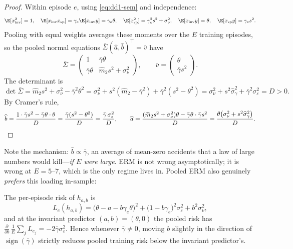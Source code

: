 \begin{proof}
Within episode $e$, using \eqref{eq:dd1-sem} and independence:
\[
\E[x_{\mathrm{inv}}^2] = 1, \quad
\E[x_{\mathrm{inv}} x_{\mathrm{sp}}] = \gamma_e \E[x_{\mathrm{inv}} y]
= \gamma_e \theta, \quad
\E[x_{\mathrm{sp}}^2] = \gamma_e^2 s^2 + \sigma_\nu^2, \quad
\E[x_{\mathrm{inv}} y] = \theta, \quad
\E[x_{\mathrm{sp}} y] = \gamma_e s^2 .
\]
Pooling with equal weights averages these moments over the $E$ training
episodes, so the pooled normal equations
$\bar{\Sigma} (\widehat a, \widehat b)^\top = \bar v$ have
\[
\bar{\Sigma} = \begin{pmatrix} 1 & \bar{\gamma}\theta \\
\bar{\gamma}\theta & \widehat{m}_2 s^2 + \sigma_\nu^2 \end{pmatrix},
\qquad
\bar v = \begin{pmatrix} \theta \\ \bar{\gamma} s^2 \end{pmatrix}.
\]
The determinant is
\[
\det \bar{\Sigma}
= \widehat{m}_2 s^2 + \sigma_\nu^2 - \bar{\gamma}^2 \theta^2
= \sigma_\nu^2 + s^2(\widehat{m}_2 - \bar{\gamma}^2)
+ \bar{\gamma}^2 (s^2 - \theta^2)
= \sigma_\nu^2 + s^2 \widehat{\sigma}_\gamma^2
+ \bar{\gamma}^2 \sigma_\varepsilon^2 = D > 0 .
\]
By Cramer's rule,
\[
\widehat{b} = \frac{1 \cdot \bar{\gamma} s^2 - \bar{\gamma}\theta \cdot
\theta}{D} = \frac{\bar{\gamma}(s^2 - \theta^2)}{D}
= \frac{\bar{\gamma}\, \sigma_\varepsilon^2}{D},
\qquad
\widehat{a} = \frac{(\widehat{m}_2 s^2 + \sigma_\nu^2)\theta -
\bar{\gamma}\theta \cdot \bar{\gamma} s^2}{D}
= \frac{\theta\bigl( \sigma_\nu^2 + s^2 \widehat{\sigma}_\gamma^2
\bigr)}{D}. \qedhere
\]
\end{proof}

Note the mechanism: $\widehat{b} \propto \bar{\gamma}$, an average of
mean-zero accidents that a law of large numbers would kill---\emph{if $E$
were large}. ERM is not wrong asymptotically; it is wrong at $E = 5$--$7$,
which is the only regime \nm{} lives in. Pooled ERM also genuinely
\emph{prefers} this loading in-sample:

\begin{lemma}
\label{lem:dd1-erm-descends}
The per-episode risk of $h_{a,b}$ is
\begin{equation}
\label{eq:dd1-Le}
L_e(h_{a,b})
= \bigl( \theta - a - b\gamma_e\theta \bigr)^2
+ \bigl( 1 - b\gamma_e \bigr)^2 \sigma_\varepsilon^2
+ b^2 \sigma_\nu^2,
\end{equation}
and at the invariant predictor $(a, b) = (\theta, 0)$ the pooled risk has
$\frac{\partial}{\partial b}\, \frac{1}{E}\sum_j L_{e_j} =
-2\bar{\gamma}\sigma_\varepsilon^2$. Hence whenever $\bar{\gamma} \neq 0$,
moving $b$ slightly in the direction of $\operatorname{sign}(\bar\gamma)$
strictly reduces pooled training risk below the invariant predictor's.
\end{lemma}

